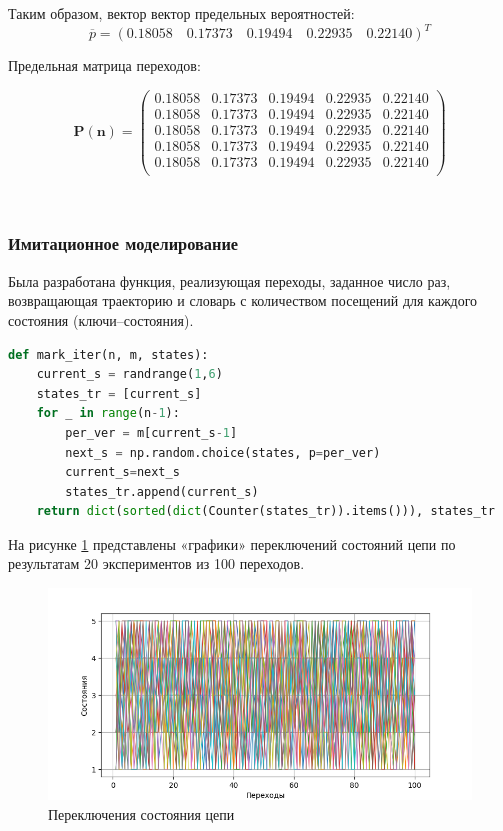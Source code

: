 Таким образом, вектор вектор предельных вероятностей:
$$\overline{p}=(0.18058\quad 0.17373\quad 0.19494\quad 0.22935\quad 0.22140)^T$$

Предельная матрица переходов:

$$\mathbf{P(n)}=\begin{pmatrix}
0.18058 & 0.17373 & 0.19494 & 0.22935 & 0.22140\\
0.18058 & 0.17373 & 0.19494 & 0.22935 & 0.22140\\
0.18058 & 0.17373 & 0.19494 & 0.22935 & 0.22140\\
0.18058 & 0.17373 & 0.19494 & 0.22935 & 0.22140\\
0.18058 & 0.17373 & 0.19494 & 0.22935 & 0.22140\\
\end{pmatrix} $$

~\\

\subsubsection{Имитационное моделирование}

Была разработана функция, реализующая переходы, заданное число раз, возвращающая траекторию и словарь с количеством посещений для каждого состояния (ключи--состояния).

\begin{lstlisting}[language=python, label=prog,caption={\textit{реализация марковского процесса}}]
def mark_iter(n, m, states):
    current_s = randrange(1,6)
    states_tr = [current_s]
    for _ in range(n-1):
        per_ver = m[current_s-1]
        next_s = np.random.choice(states, p=per_ver)
        current_s=next_s
        states_tr.append(current_s)
    return dict(sorted(dict(Counter(states_tr)).items())), states_tr
\end{lstlisting}

На рисунке \ref{iter} представлены «графики» переключений состояний цепи по результатам 20 экспериментов из 100 переходов.

\begin{figure}[!h]
\centerline{\includegraphics[width = \columnwidth]{Images/iter.png}}
\caption{Переключения состояния цепи}
\label{iter}
\end{figure}

